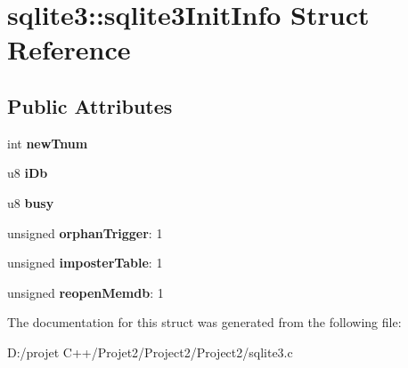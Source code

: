 \hypertarget{structsqlite3_1_1sqlite3_init_info}{}\section{sqlite3\+:\+:sqlite3\+Init\+Info Struct Reference}
\label{structsqlite3_1_1sqlite3_init_info}
\subsection*{Public Attributes}
\begin{DoxyCompactItemize}
\item 
\mbox{\label{structsqlite3_1_1sqlite3_init_info_a65250c8c5f215989e64294ede6c1c268}} 
int {\bfseries new\+Tnum}
\item 
\mbox{\label{structsqlite3_1_1sqlite3_init_info_af72389cb54753544c0f578605e6604bb}} 
u8 {\bfseries i\+Db}
\item 
\mbox{\label{structsqlite3_1_1sqlite3_init_info_a6ac01842e0ae68023cb60fea93bd8688}} 
u8 {\bfseries busy}
\item 
\mbox{\label{structsqlite3_1_1sqlite3_init_info_ad82b2e7902a9a334061b2abf5fa488e0}} 
unsigned {\bfseries orphan\+Trigger}\+: 1
\item 
\mbox{\label{structsqlite3_1_1sqlite3_init_info_a0340c57f98fc3ea3b0077e1c6d1e56b0}} 
unsigned {\bfseries imposter\+Table}\+: 1
\item 
\mbox{\label{structsqlite3_1_1sqlite3_init_info_a102ef0d40010ee47c56252b32eb52729}} 
unsigned {\bfseries reopen\+Memdb}\+: 1
\end{DoxyCompactItemize}


The documentation for this struct was generated from the following file\+:\begin{DoxyCompactItemize}
\item 
D\+:/projet C++/\+Projet2/\+Project2/\+Project2/sqlite3.\+c\end{DoxyCompactItemize}
